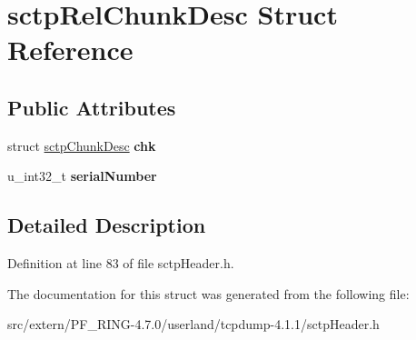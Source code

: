 \hypertarget{structsctp_rel_chunk_desc}{
\section{sctpRelChunkDesc Struct Reference}
\label{structsctp_rel_chunk_desc}
}
\subsection*{Public Attributes}
\begin{DoxyCompactItemize}
\item 
\hypertarget{structsctp_rel_chunk_desc_acbacb2e8995c4ad705c25780ad23a726}{
struct \hyperlink{structsctp_chunk_desc}{sctpChunkDesc} {\bfseries chk}}
\label{structsctp_rel_chunk_desc_acbacb2e8995c4ad705c25780ad23a726}

\item 
\hypertarget{structsctp_rel_chunk_desc_a5ed8d37842f1e5570713137e4ebcd7ed}{
u\_\-int32\_\-t {\bfseries serialNumber}}
\label{structsctp_rel_chunk_desc_a5ed8d37842f1e5570713137e4ebcd7ed}

\end{DoxyCompactItemize}


\subsection{Detailed Description}


Definition at line 83 of file sctpHeader.h.



The documentation for this struct was generated from the following file:\begin{DoxyCompactItemize}
\item 
src/extern/PF\_\-RING-\/4.7.0/userland/tcpdump-\/4.1.1/sctpHeader.h\end{DoxyCompactItemize}

